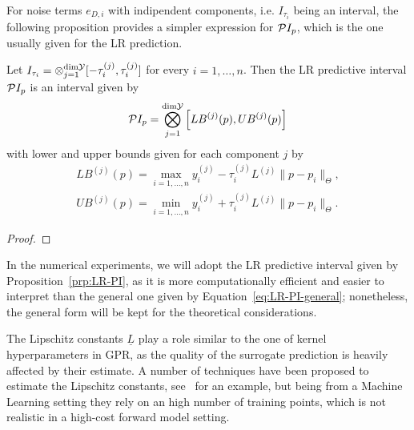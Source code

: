 For noise terms $e_{D,i}$ with indipendent components, i.e. $I_{\tau_i}$ being an interval, the following proposition provides a simpler expression for $\mathcal PI_p$, which is the one usually given for the LR prediction.
\begin{prp}\label{prp:LR-PI}
    Let $I_{\tau_i} = \otimes_{j=1}^{\text{dim}\mathcal Y} [ -\tau_i^{(j)}, \tau_i^{(j)} ]$ for every $i = 1, \dots, n$.
    Then the LR predictive interval $\mathcal PI_p$ is an interval given by
    \begin{equation}\label{eq:LR-PI}
        \mathcal PI_p = \bigotimes_{j=1}^{\text{dim}\mathcal Y} \left[ LB^{(j)}(p), UB^{(j)}(p)\right]
    \end{equation}
    with lower and upper bounds given for each component $j$ by
    \begin{equation} \label{LR-bounds}
    \begin{gathered}
        LB^{(j)}(p) = \max_{i=1,\dots,n} y_i^{(j)} - \tau_i^{(j)} L^{(j)} \| p - p_i \|_\Theta, \\
        UB^{(j)}(p) = \min_{i=1,\dots,n} y_i^{(j)} + \tau_i^{(j)} L^{(j)} \| p - p_i \|_\Theta.
    \end{gathered}
    \end{equation}
\end{prp}
\begin{proof}

\end{proof}

In the numerical experiments, we will adopt the LR predictive interval given by Proposition~\ref{prp:LR-PI}, as it is more computationally efficient and easier to interpret than the general one given by Equation~\eqref{eq:LR-PI-general}; nonetheless, the general form will be kept for the theoretical considerations. \newline

The Lipschitz constants $\underline L$ play a role similar to the one of kernel hyperparameters in GPR, as the quality of the surrogate prediction is heavily affected by their estimate.
A number of techniques have been proposed to estimate the Lipschitz constants, see~\cite{Calliess2017} for an example, but being from a Machine Learning setting they rely on an high number of training points, which is not realistic in a high-cost forward model setting.

